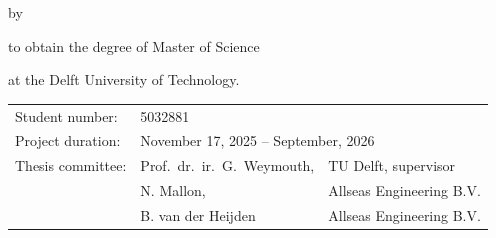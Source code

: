 \begin{titlepage}


\begin{center}


{\makeatletter
\largetitlestyle\fontsize{64}{94}\selectfont\@title
\makeatother}

{\makeatletter
\ifx\@subtitle\undefined\else
    \bigskip
   {\tudsffamily\fontsize{22}{32}\selectfont\@subtitle}    
\fi
\makeatother}

\bigskip
\bigskip

by

\bigskip
\bigskip

{\makeatletter
\largetitlestyle\fontsize{26}{26}\selectfont\@author
\makeatother}

\bigskip
\bigskip

to obtain the degree of Master of Science

at the Delft University of Technology.


\vfill

\begin{tabular}{lll}
    Student number: & 5032881 \\
    Project duration: & \multicolumn{2}{l}{November 17, 2025 -- September, 2026} \\
    Thesis committee: & Prof.\ dr.\ ir.\ G.\ Weymouth, & TU Delft, supervisor \\
        & N. Mallon, & Allseas Engineering B.V. \\
        & B. van der Heijden & Allseas Engineering B.V.\\ 
\end{tabular}

\bigskip
\bigskip

\bigskip
\bigskip


\end{center}
\end{titlepage}

